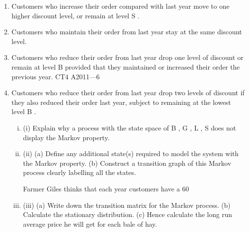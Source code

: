 \documentclass[a4paper,12pt]{article}
\begin{document}
\begin{enumerate}[1]
[Total 14]
Farmer Giles makes hay each year and he makes far more than he could possibly store
and use himself, but he does not always sell it all. He has decided to offer incentives
for people to buy large quantities so it does not sit in his field deteriorating. He has
devised the following “discount” scheme.
He has a Base price, B of £8 per bale. Then he has three levels of discount: Good
price, G , is a 10%
25%
\item Customers who increase their order compared with last year move to one higher
discount level, or remain at level S .
\item Customers who maintain their order from last year stay at the same discount level.
\item Customers who reduce their order from last year drop one level of discount or
remain at level B provided that they maintained or increased their order the
previous year.
CT4 A2011—6\item
Customers who reduce their order from last year drop two levels of discount if
they also reduced their order last year, subject to remaining at the lowest level B .
\begin{enumerate}[(i)]
\item (i) Explain why a process with the state space of { B , G , L , S } does not display the Markov property.
\item 
(ii) (a)
Define any additional state(s) required to model the system with the Markov property.
(b)
Construct a transition graph of this Markov process clearly labelling
all the states.

Farmer Giles thinks that each year customers have a 60%
\item (iii)
(a) Write down the transition matrix for the Markov process.
(b) Calculate the stationary distribution.
(c) Hence calculate the long run average price he will get for each bale of hay.


\end{enumerate}
\end{enumerate}
\end{document}
